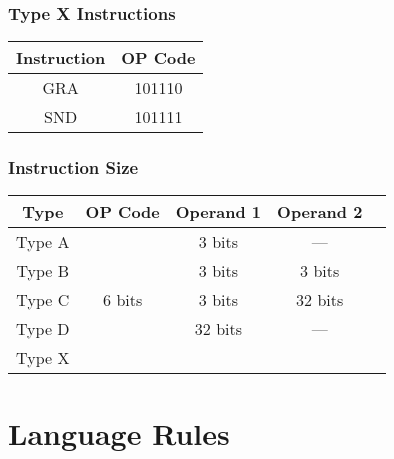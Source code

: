 \documentclass[a4paper, 11pt]{report}
\begin{document}
\subsubsection{Type X Instructions}
\begin{center}
    \begin{tabular}{|c|c|}
        \hline
        \textbf{Instruction} & \textbf{OP Code} \\
        \hline
        GRA                  & 101110           \\
        \hline
        SND                  & 101111           \\
        \hline
    \end{tabular}
\end{center}

\subsubsection{Instruction Size}
\begin{center}
    \begin{tabular}{|c|c|c|c|c|}
        \hline
        \textbf{Type} & \textbf{OP Code} & \textbf{Operand 1} & \textbf{Operand 2} \\
        \hline
        Type A        &                  & 3 bits             & ---                \\
        \cline{1-1}
        \cline{3-4}
        Type B        &                  & 3 bits             & 3 bits             \\
        \cline{1-1}
        \cline{3-4}
        Type C        & 6 bits           & 3 bits             & 32 bits            \\
        \cline{1-1}
        \cline{3-4}
        Type D        &                  & 32 bits            & ---                \\
        \cline{1-1}
        \cline{3-4}
        Type X        &                  &                    &                    \\
        \hline
    \end{tabular}
\end{center}

\section{Language Rules}
\end{document}
